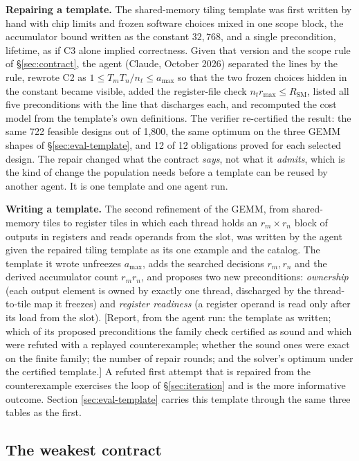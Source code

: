 \documentclass[11pt]{article}
\newcommand{\pending}[1]{\textcolor{red!65!black}{[#1]}}
\begin{document}
\textbf{Repairing a template.} The shared-memory tiling template was first written by hand with chip limits and frozen software choices mixed in one scope block, the accumulator bound written as the constant \(32{,}768\), and a single precondition, lifetime, as if C3 alone implied correctness. Given that version and the scope rule of §\ref{sec:contract}, the agent (Claude, October 2026) separated the lines by the rule, rewrote C2 as \(1\le T_mT_n/n_t\le a_{\max}\) so that the two frozen choices hidden in the constant became visible, added the register-file check \(n_t r_{\max}\le R_{\mathrm{SM}}\), listed all five preconditions with the line that discharges each, and recomputed the cost model from the template's own definitions. The verifier re-certified the result: the same 722 feasible designs out of 1,800, the same optimum on the three GEMM shapes of §\ref{sec:eval-template}, and 12 of 12 obligations proved for each selected design. The repair changed what the contract \emph{says}, not what it \emph{admits}, which is the kind of change the population needs before a template can be reused by another agent. It is one template and one agent run.

\textbf{Writing a template.} The second refinement of the GEMM, from shared-memory tiles to register tiles in which each thread holds an \(r_m\times r_n\) block of outputs in registers and reads operands from the slot, was written by the agent given the repaired tiling template as its one example and the catalog. The template it wrote unfreezes \(a_{\max}\), adds the searched decisions \(r_m, r_n\) and the derived accumulator count \(r_m r_n\), and proposes two new preconditions: \emph{ownership} (each output element is owned by exactly one thread, discharged by the thread-to-tile map it freezes) and \emph{register readiness} (a register operand is read only after its load from the slot). \pending{Report, from the agent run: the template as written; which of its proposed preconditions the family check certified as sound and which were refuted with a replayed counterexample; whether the sound ones were exact on the finite family; the number of repair rounds; and the solver's optimum under the certified template.} A refuted first attempt that is repaired from the counterexample exercises the loop of §\ref{sec:iteration} and is the more informative outcome. Section \ref{sec:eval-template} carries this template through the same three tables as the first.

\subsection{The weakest contract}\label{sec:weakest}
\end{document}
